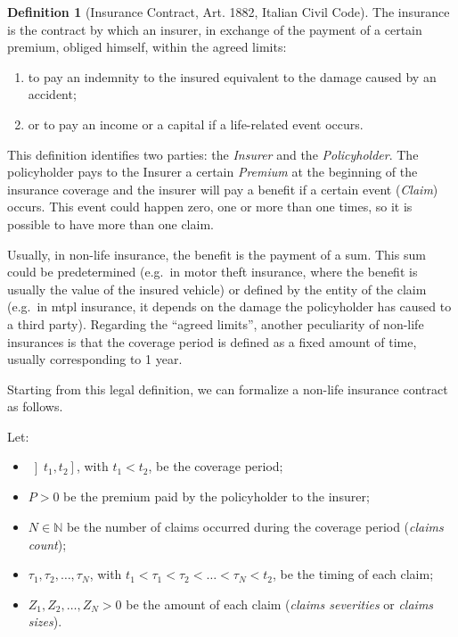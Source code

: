 \documentclass[a4paper, twoside, openright, 12pt]{report}
\providecommand{\tightlist}{%
  \setlength{\itemsep}{0pt}\setlength{\parskip}{0pt}}
\theoremstyle{definition}
\newtheorem{definition}{Definition}[chapter]
\theoremstyle{definition}
\theoremstyle{definition}
\theoremstyle{remark}
\begin{document}
\begin{definition}[Insurance Contract, Art. 1882, Italian Civil Code]
\label{def:ins-contr} \iffalse (Insurance Contract, Art. 1882, Italian Civil Code) \fi{} The insurance is the contract by which an insurer, in exchange of the payment of a certain premium, obliged himself, within the agreed limits:

\begin{enumerate}[noitemsep]
  \item to pay an indemnity to the insured equivalent to the damage caused by an accident;
  \item or to pay an income or a capital if a life-related event occurs.
\end{enumerate}
\end{definition}

This definition identifies two parties: the \emph{Insurer} and the \emph{Policyholder}. The policyholder pays to the Insurer a certain \emph{Premium} at the beginning of the insurance coverage and the insurer will pay a benefit if a certain event (\emph{Claim}) occurs. This event could happen zero, one or more than one times, so it is possible to have more than one claim.

Usually, in non-life insurance, the benefit is the payment of a sum. This sum could be predetermined (e.g.~in motor theft insurance, where the benefit is usually the value of the insured vehicle) or defined by the entity of the claim (e.g.~in \ac{mtpl} insurance, it depends on the damage the policyholder has caused to a third party). Regarding the ``agreed limits'', another peculiarity of non-life insurances is that the coverage period is defined as a fixed amount of time, usually corresponding to 1 year.

Starting from this legal definition, we can formalize a non-life insurance contract as follows.

Let:

\begin{itemize}
\tightlist
\item
  \(\left]t_1, t_2\right]\), with \(t_1<t_2\), be the coverage period;
\item
  \(P>0\) be the premium paid by the policyholder to the insurer;
\item
  \(N\in\mathbb{N}\) be the number of claims occurred during the coverage period (\emph{claims count});
\item
  \(\tau_1, \tau_2, \dots, \tau_N\), with \(t_1<\tau_1< \tau_2 < \dots < \tau_N<t_2\), be the timing of each claim;
\item
  \(Z_1, Z_2, \dots, Z_N > 0\) be the amount of each claim (\emph{claims severities} or \emph{claims sizes}).
\end{itemize}
\end{document}
